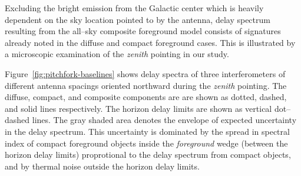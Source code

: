 \documentclass[preprint2,iop,numberedappendix]{emulateapj}
\begin{document}
Excluding the bright emission from the Galactic center which is heavily dependent on the sky location pointed to by the antenna, delay spectrum resulting from the all--sky composite foreground model consists of signatures already noted in the diffuse and compact foreground cases. This is illustrated by a microscopic examination of the {\it zenith} pointing in our study. 

Figure~\ref{fig:pitchfork-baselines} shows delay spectra of three interferometers of different antenna spacings oriented northward during the {\it zenith} pointing. The diffuse, compact, and composite components are are shown as dotted, dashed, and solid lines respectively. The horizon delay limits are shown as vertical dot--dashed lines. The gray shaded area denotes the envelope of expected uncertainty in the delay spectrum. This uncertainty is dominated by the spread in spectral index of compact foreground objects inside the {\it foreground} wedge (between the horizon delay limits) proprotional to the delay spectrum from compact objects, and by thermal noise outside the horizon delay limits.
\end{document}

